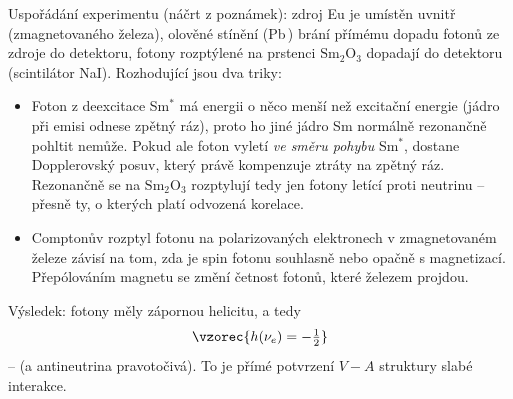 \begin{center}
\end{center}

Uspořádání experimentu (náčrt z poznámek): zdroj Eu je umístěn uvnitř 
(zmagnetovaného železa), olověné stínění (Pb\,) brání přímému dopadu fotonů ze zdroje do
detektoru, fotony rozptýlené na prstenci \(\mathrm{Sm_2O_3}\) dopadají do detektoru (scintilátor
NaI). Rozhodující jsou dva triky:
\begin{itemize}
  \item {} Foton z deexcitace Sm\(^*\) má energii o
        něco menší než excitační energie (jádro při emisi odnese zpětný ráz), proto ho jiné
        jádro Sm normálně rezonančně pohltit nemůže. Pokud ale foton vyletí \emph{ve směru
        pohybu} Sm\(^*\), dostane Dopplerovský posuv, který právě kompenzuje ztráty na zpětný
        ráz. Rezonančně se na \(\mathrm{Sm_2O_3}\) rozptylují tedy jen fotony letící proti
        neutrinu -- přesně ty, o kterých platí odvozená korelace.
  \item {} Comptonův rozptyl fotonu na polarizovaných elektronech
        v zmagnetovaném železe závisí na tom, zda je spin fotonu souhlasně nebo opačně s
        magnetizací. Přepólováním magnetu se změní četnost fotonů, které železem projdou.
\end{itemize}
Výsledek: fotony měly zápornou helicitu, a tedy
\[
  \vzorec{h(\nu_e) = -\tfrac12}
\]
--  (a antineutrina pravotočivá). To je přímé potvrzení
\(V-A\) struktury slabé interakce.

